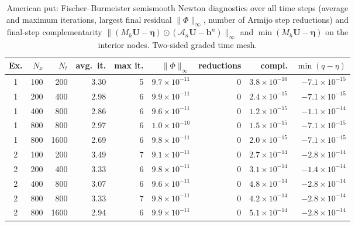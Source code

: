 \begin{table}[htbp]
\centering
\scriptsize
\caption{American put: Fischer--Burmeister semismooth Newton diagnostics over all time steps (average and maximum iterations, largest final residual $\|\Phi\|_\infty$, number of Armijo step reductions) and final-step complementarity $\|(M_h\mathbf U-\boldsymbol\eta)\odot(\mathcal A_n\mathbf U-\mathbf b^n)\|_\infty$ and $\min(M_h\mathbf U-\boldsymbol\eta)$ on the interior nodes.  Two-sided graded time mesh.}
\label{tab:ssn}
\begin{tabular}{crrrrrrrr}
\toprule
Ex. & $N_x$ & $N_t$ & avg.\ it. & max it. & $\|\Phi\|_\infty$ & reductions & compl. & $\min(q-\eta)$ \\
\midrule
1 & 100 & 200 & 3.30 & 5 & $9.7\times10^{-11}$ & 0 & $3.8\times10^{-16}$ & $-7.1\times10^{-15}$ \\
1 & 200 & 400 & 2.98 & 6 & $9.9\times10^{-11}$ & 0 & $2.4\times10^{-15}$ & $-7.1\times10^{-15}$ \\
1 & 400 & 800 & 2.86 & 6 & $9.6\times10^{-11}$ & 0 & $1.2\times10^{-15}$ & $-1.1\times10^{-14}$ \\
1 & 800 & 800 & 2.97 & 6 & $1.0\times10^{-10}$ & 0 & $1.5\times10^{-15}$ & $-7.1\times10^{-15}$ \\
1 & 800 & 1600 & 2.69 & 6 & $9.8\times10^{-11}$ & 0 & $2.0\times10^{-15}$ & $-7.1\times10^{-15}$ \\
2 & 100 & 200 & 3.49 & 7 & $9.1\times10^{-11}$ & 0 & $2.7\times10^{-14}$ & $-2.8\times10^{-14}$ \\
2 & 200 & 400 & 3.33 & 6 & $9.8\times10^{-11}$ & 0 & $3.1\times10^{-14}$ & $-1.4\times10^{-14}$ \\
2 & 400 & 800 & 3.07 & 6 & $9.6\times10^{-11}$ & 0 & $4.8\times10^{-14}$ & $-2.8\times10^{-14}$ \\
2 & 800 & 800 & 3.33 & 7 & $9.8\times10^{-11}$ & 0 & $4.2\times10^{-14}$ & $-2.8\times10^{-14}$ \\
2 & 800 & 1600 & 2.94 & 6 & $9.9\times10^{-11}$ & 0 & $5.1\times10^{-14}$ & $-2.8\times10^{-14}$ \\
\bottomrule
\end{tabular}
\end{table}
